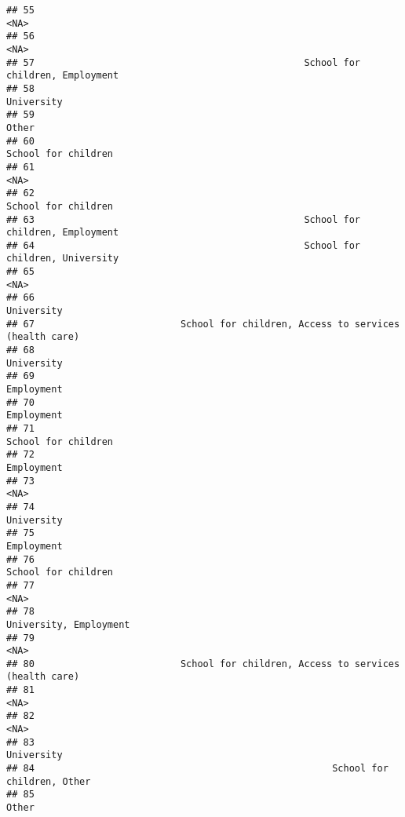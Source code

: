 \documentclass[
]{article}
\begin{document}
\begin{verbatim}
## 55                                                                           <NA>
## 56                                                                           <NA>
## 57                                                School for children, Employment
## 58                                                                     University
## 59                                                                          Other
## 60                                                            School for children
## 61                                                                           <NA>
## 62                                                            School for children
## 63                                                School for children, Employment
## 64                                                School for children, University
## 65                                                                           <NA>
## 66                                                                     University
## 67                          School for children, Access to services (health care)
## 68                                                                     University
## 69                                                                     Employment
## 70                                                                     Employment
## 71                                                            School for children
## 72                                                                     Employment
## 73                                                                           <NA>
## 74                                                                     University
## 75                                                                     Employment
## 76                                                            School for children
## 77                                                                           <NA>
## 78                                                         University, Employment
## 79                                                                           <NA>
## 80                          School for children, Access to services (health care)
## 81                                                                           <NA>
## 82                                                                           <NA>
## 83                                                                     University
## 84                                                     School for children, Other
## 85                                                                          Other

\end{verbatim}
\end{document}
